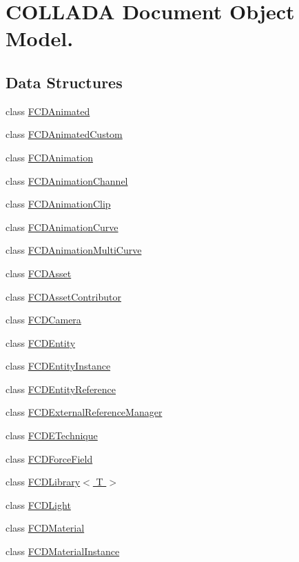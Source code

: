 \hypertarget{group__FCDocument}{
\section{COLLADA Document Object Model.}
\label{group__FCDocument}
}
\subsection*{Data Structures}
\begin{DoxyCompactItemize}
\item 
class \hyperlink{classFCDAnimated}{FCDAnimated}
\item 
class \hyperlink{classFCDAnimatedCustom}{FCDAnimatedCustom}
\item 
class \hyperlink{classFCDAnimation}{FCDAnimation}
\item 
class \hyperlink{classFCDAnimationChannel}{FCDAnimationChannel}
\item 
class \hyperlink{classFCDAnimationClip}{FCDAnimationClip}
\item 
class \hyperlink{classFCDAnimationCurve}{FCDAnimationCurve}
\item 
class \hyperlink{classFCDAnimationMultiCurve}{FCDAnimationMultiCurve}
\item 
class \hyperlink{classFCDAsset}{FCDAsset}
\item 
class \hyperlink{classFCDAssetContributor}{FCDAssetContributor}
\item 
class \hyperlink{classFCDCamera}{FCDCamera}
\item 
class \hyperlink{classFCDEntity}{FCDEntity}
\item 
class \hyperlink{classFCDEntityInstance}{FCDEntityInstance}
\item 
class \hyperlink{classFCDEntityReference}{FCDEntityReference}
\item 
class \hyperlink{classFCDExternalReferenceManager}{FCDExternalReferenceManager}
\item 
class \hyperlink{classFCDETechnique}{FCDETechnique}
\item 
class \hyperlink{classFCDForceField}{FCDForceField}
\item 
class \hyperlink{classFCDLibrary}{FCDLibrary$<$ T $>$}
\item 
class \hyperlink{classFCDLight}{FCDLight}
\item 
class \hyperlink{classFCDMaterial}{FCDMaterial}
\item 
class \hyperlink{classFCDMaterialInstance}{FCDMaterialInstance}

\end{DoxyCompactItemize}
